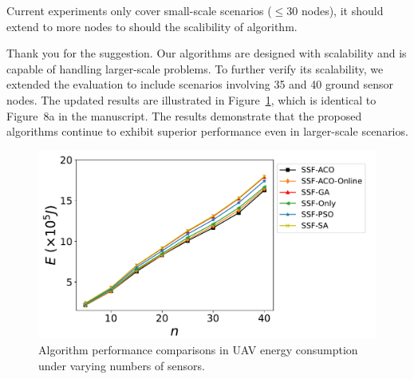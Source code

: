 \begin{revcomment}
	Current experiments only cover small-scale scenarios ($\leq 30$ nodes), it should extend to more nodes to should the scalibility of algorithm.
\end{revcomment}
\begin{revresponse}
	Thank you for the suggestion.
	Our algorithms are designed with scalability and is capable of handling larger-scale problems.
	To further verify its scalability, we extended the evaluation to include scenarios involving 35 and 40 ground sensor nodes. The updated results are illustrated in Figure~\ref{fig:40nodes}, which is identical to Figure~8a in the manuscript. The results demonstrate that the proposed algorithms continue to exhibit superior performance even in larger-scale scenarios.
	\begin{figure}[h]
		\centerline{\includegraphics[width=.65\textwidth]{fig/exp_number_40_legend.pdf}}
		\caption{Algorithm performance comparisons in UAV energy consumption under varying numbers of sensors.}
		\label{fig:40nodes}
	\end{figure}
\end{revresponse}

